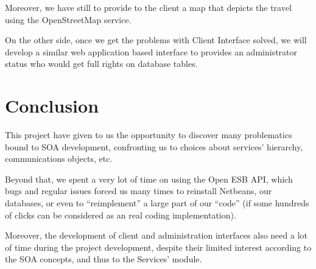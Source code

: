 \documentclass[a4paper]{article}
\begin{document}
		Moreover, we have still to provide to the client a map that depicts the travel using the OpenStreetMap service.
		
		On the other side, once we get the problems with Client Interface solved, we will develop a similar web application based interface to provides an administrator status who would get full rights on database tables.
	\newpage
	\section*{Conclusion}

		This project have given to us the opportunity to discover many problematics bound to SOA development, confronting us to choices about services' hierarchy, communications objects, etc.
		
		Beyond that, we spent a very lot of time on using the Open ESB API, which bugs and regular issues forced us many times to reinstall Netbeans, our databases, or even to ``reimplement'' a large part of our ``code'' (if some hundreds of clicks can be considered as an real coding implementation).
		
		Moreover, the development of client and administration interfaces also need a lot of time during the project development, despite their limited interest according to the SOA concepts, and thus to the Services' module.
\end{document}
